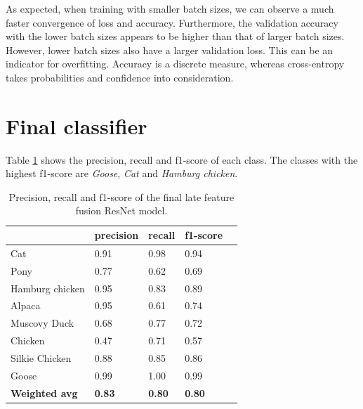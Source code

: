 \documentclass{l4proj}
\begin{document}
As expected, when training with smaller batch sizes, we can observe a much faster convergence of loss and accuracy. Furthermore, the validation accuracy with the lower batch sizes appears to be higher than that of larger batch sizes. However, lower batch sizes also have a larger validation loss. This can be an indicator for overfitting. Accuracy is a discrete measure, whereas cross-entropy takes probabilities and confidence into consideration.


\section{Final classifier}

Table \ref{table:final_classifier_scores} shows the precision, recall and f1-score of each class. The classes with the highest f1-score are \textit{Goose}, \textit{Cat} and \textit{Hamburg chicken}. 

\begin{table}[ht]
  \centering
  \begin{tabular}{@{}lllll@{}}
  \toprule
                        & \textbf{precision} & \textbf{recall} & \textbf{f1-score} &  \\ \midrule
  Cat                   & 0.91               & 0.98            & 0.94              &  \\
  Pony                  & 0.77               & 0.62            & 0.69              &  \\
  Hamburg chicken       & 0.95               & 0.83            & 0.89              &  \\
  Alpaca                & 0.95               & 0.61            & 0.74              &  \\
  Muscovy Duck          & 0.68               & 0.77            & 0.72              &  \\
  Chicken               & 0.47               & 0.71            & 0.57              &  \\
  Silkie Chicken        & 0.88               & 0.85            & 0.86              &  \\
  Goose                 & 0.99               & 1.00            & 0.99              &  \\
  \textbf{Weighted avg} & \textbf{0.83}      & \textbf{0.80}   & \textbf{0.80}     &  \\ \bottomrule
  \end{tabular}
  \caption{Precision, recall and f1-score of the final late feature fusion ResNet model.}
  \label{table:final_classifier_scores}
\end{table}
\end{document}

